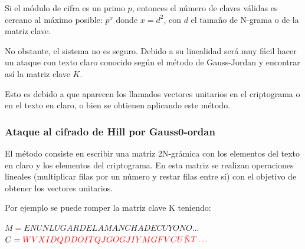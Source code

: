 \documentclass{article}
\begin{document}
Si el módulo de cifra es un primo $p$, entonces el número de claves válidas es cercano al máximo posible: $p^{x}$ donde $x=d^{2}$, con  $d$ el tamaño de N-grama o de la matriz clave.

No obstante, el sistema no es seguro. Debido a su linealidad será muy fácil hacer un ataque con texto claro conocido según el método de Gauss-Jordan y encontrar así la matriz clave $K$. 

Esto es debido a que aparecen los llamados vectores unitarios en el criptograma o en el texto en claro, o bien se obtienen aplicando este método. 

\subsubsection{Ataque al cifrado de Hill por Gauss0-ordan}
\justify
El método consiste en escribir una matriz 2N-grámica con los elementos del texto en claro y los elementos del criptograma. En esta matriz se realizan operaciones lineales (multiplicar filas por un número y restar filas entre sí) con el objetivo de obtener los vectores unitarios.

Por ejemplo se puede romper la matriz clave K teniendo:

$M = ENU NLU GAR DEL AMA NCH ADE CUY ONO \ldots$\\
$C = \textcolor{red}{WVX IDQ DDO ITQ JGO GJI YMG FVC U}$\textcolor{red}{\~{N}}$ \textcolor{red}{T \ldots}$
\end{document}
